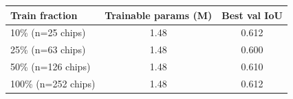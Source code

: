 \begin{tabular}{lcc}
\toprule
Train fraction & Trainable params (M) & Best val IoU \\
\midrule
10\% (n=25 chips) & 1.48 & 0.612 \\
25\% (n=63 chips) & 1.48 & 0.600 \\
50\% (n=126 chips) & 1.48 & 0.610 \\
100\% (n=252 chips) & 1.48 & 0.612 \\
\bottomrule
\end{tabular}
